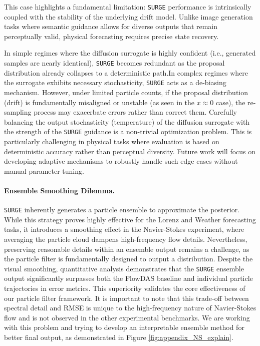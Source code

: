 \documentclass{article}
\theoremstyle{plain}
\theoremstyle{definition}
\theoremstyle{remark}
\begin{document}
This case highlights a fundamental limitation: \texttt{SURGE} performance is intrinsically coupled with the stability of the underlying drift model. Unlike image generation tasks where semantic guidance allows for diverse outputs that remain perceptually valid, physical forecasting requires precise state recovery.

In simple regimes where the diffusion surrogate is highly confident (i.e., generated samples are nearly identical), \texttt{SURGE} becomes redundant as the proposal distribution already collapses to a deterministic path.In complex regimes where the surrogate exhibits necessary stochasticity, \texttt{SURGE} acts as a de-biasing mechanism. However, under limited particle counts, if the proposal distribution (drift) is fundamentally misaligned or unstable (as seen in the $x \approx 0$ case), the re-sampling process may exacerbate errors rather than correct them. Carefully balancing the output stochasticity (temperature) of the diffusion surrogate with the strength of the \texttt{SURGE} guidance is a non-trivial optimization problem. This is particularly challenging in physical tasks where evaluation is based on deterministic accuracy rather than perceptual diversity. Future work will focus on developing adaptive mechanisms to robustly handle such edge cases without manual parameter tuning.

\paragraph{Ensemble Smoothing Dilemma.} \texttt{SURGE} inherently generates a particle ensemble to approximate the posterior. While this strategy proves highly effective for the Lorenz and Weather forecasting tasks, it introduces a smoothing effect in the Navier-Stokes experiment, where averaging the particle cloud dampens high-frequency flow details. Nevertheless, preserving reasonable details within an ensemble output remains a challenge, as the particle filter is fundamentally designed to output a distribution. Despite the visual smoothing, quantitative analysis demonstrates that the \texttt{SURGE} ensemble output significantly surpasses both the FlowDAS baseline and individual particle trajectories in error metrics. This superiority validates the core effectiveness of our particle filter framework. It is important to note that this trade-off between spectral detail and RMSE is unique to the high-frequency nature of Navier-Stokes flow and is not observed in the other experimental benchmarks. We are working with this problem and trying to develop an interpretable ensemble method for better final output, as demonstrated in Figure \ref{fig:appendix_NS_explain}.
\end{document}
